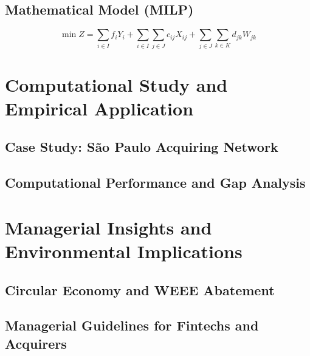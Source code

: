 \documentclass[preprint,12pt,authoryear]{elsarticle}
\begin{document}
\subsection{Mathematical Model (MILP)}
\lipsum[49-58]

\begin{equation}
\min Z = \sum_{i \in I} f_i Y_i + \sum_{i \in I} \sum_{j \in J} c_{ij} X_{ij} + \sum_{j \in J} \sum_{k \in K} d_{jk} W_{jk}
\label{eq:objective_sample}
\end{equation}

\lipsum[59-65]

\section{Computational Study and Empirical Application}
\label{sec:computational_study}
\subsection{Case Study: S\~ao Paulo Acquiring Network}
\lipsum[66-78]

\subsection{Computational Performance and Gap Analysis}
\lipsum[79-92]

\section{Managerial Insights and Environmental Implications}
\label{sec:discussion}
\subsection{Circular Economy and WEEE Abatement}
\lipsum[93-99]

\subsection{Managerial Guidelines for Fintechs and Acquirers}
\lipsum[100-107]
\end{document}
